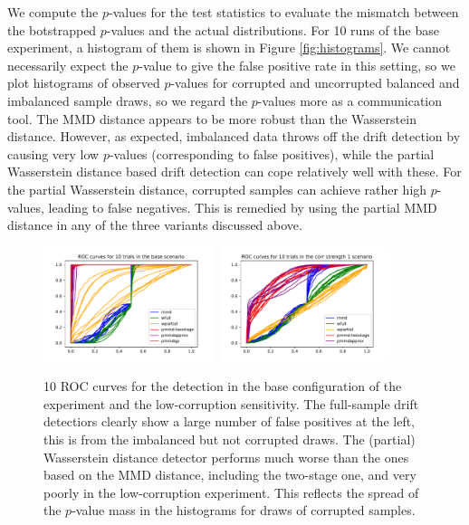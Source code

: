 \documentclass[a4paper,twoside,10pt]{article}
\theoremstyle{plain}
\theoremstyle{remark}
\begin{document}
We compute the $p$-values for the test statistics to evaluate the mismatch between the botstrapped $p$-values and the actual distributions. For 10 runs of the base experiment, a histogram of them is shown in Figure \ref{fig:histograms}.  We cannot necessarily expect the $p$-value to give the false positive rate in this setting, so we plot histograms of observed $p$-values for corrupted and uncorrupted balanced and imbalanced sample draws, so we regard the $p$-values more as a communication tool. The MMD distance appears to be more robust than the Wasserstein distance. However, as expected, imbalanced data throws off the drift detection by causing very low $p$-values (corresponding to false positives), while the partial Wasserstein distance based drift detection can cope relatively well with these. For the partial Wasserstein distance, corrupted samples can achieve rather high $p$-values, leading to false negatives. This is remedied by using the partial MMD distance in any of the three variants discussed above.

\begin{figure}
\includegraphics[width=5cm]{experiment/v1/roc-curves-10-trials-base.pdf}
\includegraphics[width=5cm]{experiment/v1/roc-curves-10-trials-corr_strength_1.pdf}
\caption{\label{fig:roc_curves_base} 10 ROC curves for the detection in the base configuration of the experiment and the low-corruption sensitivity. The full-sample drift detectiors clearly show a large number of false positives at the left, this is from the imbalanced but not corrupted draws. The (partial) Wasserstein distance detector performs much worse than the ones based on the MMD distance, including the two-stage one, and very poorly in the low-corruption experiment. This reflects the spread of the $p$-value mass in the histograms for draws of corrupted samples.}
\end{figure}
\end{document}
